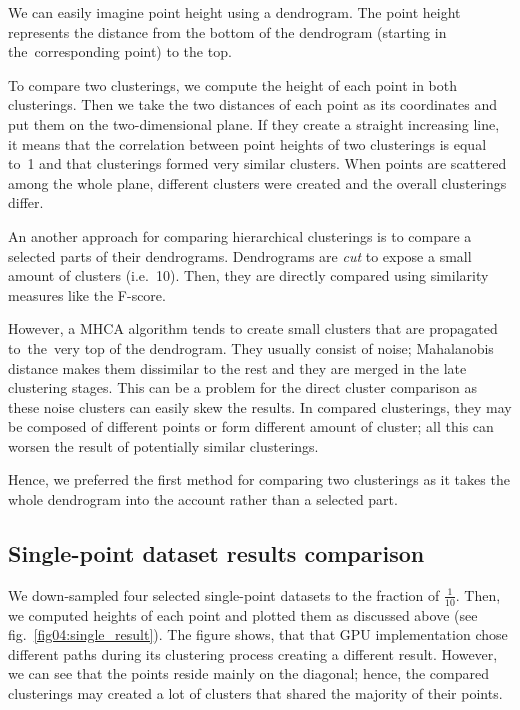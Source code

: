 We can easily imagine point height using a dendrogram. The point height represents the distance from the bottom of the dendrogram (starting in the~corresponding point) to the top.

To compare two clusterings, we compute the height of each point in both clusterings. Then we take the two distances of each point as its coordinates and put them on the two-dimensional plane. If they create a straight increasing line, it means that the correlation between point heights of two clusterings is equal to~1 and that clusterings formed very similar clusters. When points are scattered among the whole plane, different clusters were created and the overall clusterings differ.

An another approach for comparing hierarchical clusterings is to compare a selected parts of their dendrograms. Dendrograms are \emph{cut} to expose a small amount of clusters (i.e.~10). Then, they are directly compared using similarity measures like the F-score.

However, a MHCA algorithm tends to create small clusters that are propagated to~the~very top of the dendrogram. They usually consist of noise; Mahalanobis distance makes them dissimilar to the rest and they are merged in the late clustering stages. This can be a problem for the direct cluster comparison as these noise clusters can easily skew the results. In compared clusterings, they may be composed of different points or form different amount of cluster; all this can worsen the result of potentially similar clusterings. 

Hence, we preferred the first method for comparing two clusterings as it takes the whole dendrogram into the account rather than a selected part.

\subsection{Single-point dataset results comparison}

We down-sampled four selected single-point datasets to the fraction of $\frac{1}{10}$. Then, we computed heights of each point and plotted them as discussed above (see fig.~\ref{fig04:single_result}). The figure shows, that that GPU implementation chose different paths during its clustering process creating a different result. However, we can see that the points reside mainly on the diagonal; hence, the compared clusterings may created a lot of clusters that shared the majority of their points.

